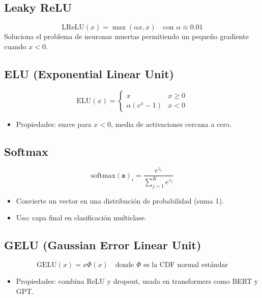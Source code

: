 \documentclass[12pt,a4paper,openany,oneside]{book}
\begin{document}
\subsection{Leaky ReLU}
\begin{equation*}
\text{LReLU}(x) = \max(\alpha x, x) \quad \text{con } \alpha \approx 0.01
\end{equation*}
Soluciona el problema de neuronas muertas permitiendo un pequeño gradiente cuando $x<0$.

\subsection{ELU (Exponential Linear Unit)}
\begin{equation*}
\text{ELU}(x) = \begin{cases} x & x \ge 0 \\ \alpha(e^x - 1) & x < 0 \end{cases}
\end{equation*}
\begin{itemize}
    \item Propiedades: suave para $x<0$, media de activaciones cercana a cero.
\end{itemize}

\subsection{Softmax}
\begin{equation*}
\text{softmax}(\mathbf{z})_i = \frac{e^{z_i}}{\sum_{j=1}^{K} e^{z_j}}
\end{equation*}
\begin{itemize}
    \item Convierte un vector en una distribución de probabilidad (suma 1).
    \item Uso: capa final en clasificación multiclase.
\end{itemize}

\subsection{GELU (Gaussian Error Linear Unit)}
\begin{equation*}
\text{GELU}(x) = x \Phi(x) \quad \text{donde } \Phi \text{ es la CDF normal estándar}
\end{equation*}
\begin{itemize}
    \item Propiedades: combina ReLU y dropout, usada en transformers como BERT y GPT.
\end{itemize}
\end{document}

